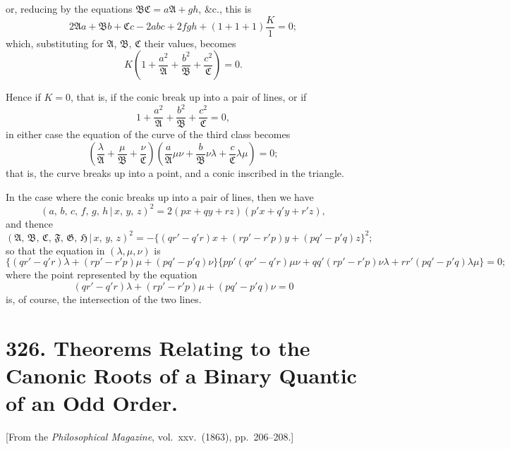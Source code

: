 \documentclass[11pt,a4paper]{article}
\theoremstyle{plain}
\begin{document}
\newpage
\noindent or, reducing by the equations $\mathfrak{B}\mathfrak{C} = a\mathfrak{A} + g h$, \&c., this is
\[
2\mathfrak{A}a + \mathfrak{B}b + \mathfrak{C}c - 2abc + 2fgh + (1+1+1)\frac{K}{1} = 0;
\]
which, substituting for $\mathfrak{A}$, $\mathfrak{B}$, $\mathfrak{C}$ their values, becomes
\[
K\!\left(1 + \frac{a^2}{\mathfrak{A}} + \frac{b^2}{\mathfrak{B}} + \frac{c^2}{\mathfrak{C}}\right) = 0.
\]

Hence if $K = 0$, that is, if the conic break up into a pair of lines, or if
\[
1 + \frac{a^2}{\mathfrak{A}} + \frac{b^2}{\mathfrak{B}} + \frac{c^2}{\mathfrak{C}} = 0,
\]
in either case the equation of the curve of the third class becomes
\[
\left(\frac{\lambda}{\mathfrak{A}} + \frac{\mu}{\mathfrak{B}} + \frac{\nu}{\mathfrak{C}}\right)\!\left(\frac{a}{\mathfrak{A}}\mu\nu + \frac{b}{\mathfrak{B}}\nu\lambda + \frac{c}{\mathfrak{C}}\lambda\mu\right) = 0;
\]
that is, the curve breaks up into a point, and a conic inscribed in the triangle.

In the case where the conic breaks up into a pair of lines, then we have
\[
(a,\,b,\,c,\,f,\,g,\,h \,\vert\, x,\,y,\,z)^2 = 2(px + qy + rz)(p'x + q'y + r'z),
\]
and thence
\[
(\mathfrak{A},\,\mathfrak{B},\,\mathfrak{C},\,\mathfrak{F},\,\mathfrak{G},\,\mathfrak{H} \,\vert\, x,\,y,\,z)^2 = -\{(qr' - q'r)x + (rp' - r'p)y + (pq' - p'q)z\}^2;
\]
so that the equation in $(\lambda,\mu,\nu)$ is
\[
\{(qr' - q'r)\lambda + (rp' - r'p)\mu + (pq' - p'q)\nu\}
\{pp'(qr' - q'r)\mu\nu + qq'(rp' - r'p)\nu\lambda + rr'(pq' - p'q)\lambda\mu\} = 0;
\]
where the point represented by the equation
\[
(qr' - q'r)\lambda + (rp' - r'p)\mu + (pq' - p'q)\nu = 0
\]
is, of course, the intersection of the two lines.


\newpage
\section*{326. Theorems Relating to the Canonic Roots of a Binary Quantic of an Odd Order.}

[From the \textit{Philosophical Magazine}, vol.\ xxv.\ (1863), pp.\ 206--208.]

\medskip
\end{document}
